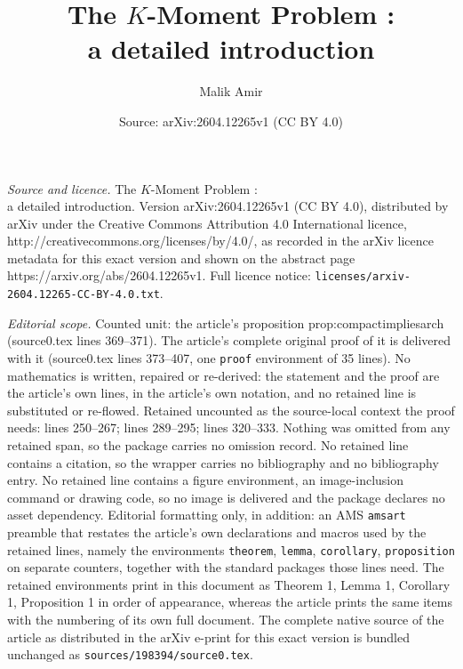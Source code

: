 \documentclass[10pt,a4paper]{amsart}
\title{The $K$-Moment Problem :\\ a detailed introduction}
\author{Malik Amir}
\date{Source: arXiv:2604.12265v1 (CC BY 4.0)}
\begin{document}
\maketitle

\noindent\emph{Source and licence.} The $K$-Moment Problem :\\ a detailed introduction. Version arXiv:2604.12265v1 (CC BY 4.0), distributed by arXiv under the Creative Commons Attribution 4.0 International licence, http://creativecommons.org/licenses/by/4.0/, as recorded in the arXiv licence metadata for this exact version and shown on the abstract page https://arxiv.org/abs/2604.12265v1. Full licence notice: \texttt{licenses/arxiv-2604.12265-CC-BY-4.0.txt}.\par\smallskip

\noindent\textit{Editorial scope.} Counted unit: the article's proposition prop:compactimpliesarch (source0.tex lines 369--371). The article's complete original proof of it is delivered with it (source0.tex lines 373--407, one \texttt{proof} environment of 35 lines). No mathematics is written, repaired or re-derived: the statement and the proof are the article's own lines, in the article's own notation, and no retained line is substituted or re-flowed.  Retained uncounted as the source-local context the proof needs: lines 250--267; lines 289--295; lines 320--333.  Nothing was omitted from any retained span, so the package carries no omission record.  No retained line contains a citation, so the wrapper carries no bibliography and no bibliography entry.  No retained line contains a figure environment, an image-inclusion command or drawing code, so no image is delivered and the package declares no asset dependency.  Editorial formatting only, in addition: an AMS \texttt{amsart} preamble that restates the article's own declarations and macros used by the retained lines, namely the environments \texttt{theorem}, \texttt{lemma}, \texttt{corollary}, \texttt{proposition} on separate counters, together with the standard packages those lines need.  The retained environments print in this document as Theorem 1, Lemma 1, Corollary 1, Proposition 1 in order of appearance, whereas the article prints the same items with the numbering of its own full document.  The complete native source of the article as distributed in the arXiv e-print for this exact version is bundled unchanged as \texttt{sources/198394/source0.tex}.
\end{document}
